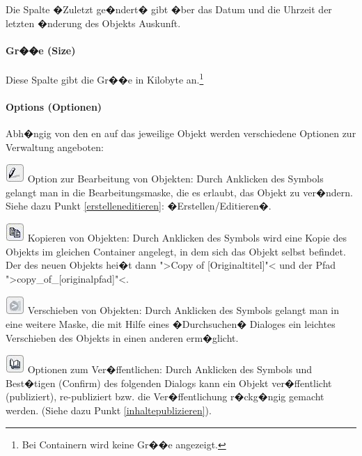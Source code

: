 Die Spalte �Zuletzt ge�ndert� gibt �ber das Datum und die Uhrzeit der letzten
�nderung des Objekts Auskunft.

\paragraph{Gr��e (Size)}

Diese Spalte gibt die Gr��e in Kilobyte an.\footnote{Bei Containern
  wird keine Gr��e angezeigt.}

\paragraph{Options (Optionen)}

Abh�ngig von den en auf das jeweilige Objekt
werden verschiedene Optionen zur Verwaltung angeboten:

\includegraphics[scale=0.7]{./images/icons_options_edit.jpg}
    Option zur Bearbeitung von Objekten: Durch Anklicken des Symbols
    gelangt man in die Bearbeitungsmaske, die es erlaubt, das Objekt zu
    ver�ndern.
    Siehe dazu Punkt \ref{erstelleneditieren}: �Erstellen/Editieren�. 

\includegraphics[scale=0.7]{./images/icons_options_copy.jpg} 
    Kopieren von Objekten: Durch Anklicken des Symbols wird eine Kopie des Objekts im gleichen Container angelegt, in dem sich das Objekt selbst befindet. Der  des neuen Objekts hei�t dann ">Copy of [Originaltitel]"< und 
    der Pfad 
     ">copy\_of\_[originalpfad]"<. 

\includegraphics[scale=0.7]{./images/icons_options_move.jpg} 
    Verschieben von Objekten: Durch Anklicken des Symbols gelangt man
    in eine weitere Maske, die mit Hilfe eines �Durchsuchen� Dialoges ein
    leichtes Verschieben des Objekts in einen anderen 
    erm�glicht. 

\includegraphics[scale=0.7]{./images/icons_options_publish.jpg}
    Optionen zum Ver�ffentlichen: Durch Anklicken des Symbols und
    Best�tigen (Confirm) des folgenden Dialogs kann ein Objekt
    ver�ffentlicht (publiziert), re-publiziert bzw. die Ver�ffentlichung
    r�ckg�ngig gemacht werden. (Siehe dazu Punkt \ref{inhaltepublizieren}). 

